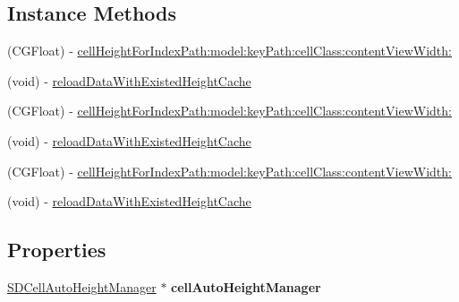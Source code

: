 \subsection*{Instance Methods}
\begin{DoxyCompactItemize}
\item 
(C\+G\+Float) -\/ \mbox{\hyperlink{category_u_i_table_view_07_s_d_auto_table_view_cell_height_08_aeaabd563f7ad3122b11e67a873a076ec}{cell\+Height\+For\+Index\+Path\+:model\+:key\+Path\+:cell\+Class\+:content\+View\+Width\+:}}
\item 
(void) -\/ \mbox{\hyperlink{category_u_i_table_view_07_s_d_auto_table_view_cell_height_08_aa214f77cb8d7d846e36c86db5710d844}{reload\+Data\+With\+Existed\+Height\+Cache}}
\item 
(C\+G\+Float) -\/ \mbox{\hyperlink{category_u_i_table_view_07_s_d_auto_table_view_cell_height_08_aeaabd563f7ad3122b11e67a873a076ec}{cell\+Height\+For\+Index\+Path\+:model\+:key\+Path\+:cell\+Class\+:content\+View\+Width\+:}}
\item 
(void) -\/ \mbox{\hyperlink{category_u_i_table_view_07_s_d_auto_table_view_cell_height_08_aa214f77cb8d7d846e36c86db5710d844}{reload\+Data\+With\+Existed\+Height\+Cache}}
\item 
(C\+G\+Float) -\/ \mbox{\hyperlink{category_u_i_table_view_07_s_d_auto_table_view_cell_height_08_aeaabd563f7ad3122b11e67a873a076ec}{cell\+Height\+For\+Index\+Path\+:model\+:key\+Path\+:cell\+Class\+:content\+View\+Width\+:}}
\item 
(void) -\/ \mbox{\hyperlink{category_u_i_table_view_07_s_d_auto_table_view_cell_height_08_aa214f77cb8d7d846e36c86db5710d844}{reload\+Data\+With\+Existed\+Height\+Cache}}
\end{DoxyCompactItemize}
\subsection*{Properties}
\begin{DoxyCompactItemize}
\item 
\mbox{\label{category_u_i_table_view_07_s_d_auto_table_view_cell_height_08_a47abf9dd6fe3bcb1cb304ead500c6c50}} 
\mbox{\hyperlink{interface_s_d_cell_auto_height_manager}{S\+D\+Cell\+Auto\+Height\+Manager}} $\ast$ {\bfseries cell\+Auto\+Height\+Manager}
\end{DoxyCompactItemize}


